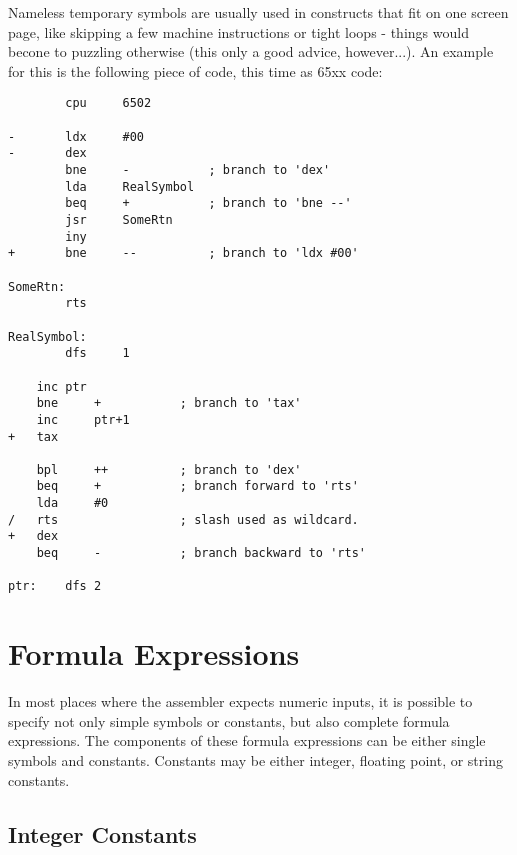 \documentclass[12pt,twoside]{report}
\begin{document}
Nameless temporary symbols are usually used in constructs that fit on one
screen page, like skipping a few machine instructions or tight loops -
things would becone to puzzling otherwise (this only a good advice,
however...).  An example for this is the following piece of code, this
time as 65xx code:
\begin{verbatim}
        cpu     6502

-       ldx     #00
-       dex
        bne     -           ; branch to 'dex'
        lda     RealSymbol
        beq     +           ; branch to 'bne --'
        jsr     SomeRtn
        iny
+       bne     --          ; branch to 'ldx #00'

SomeRtn:
        rts

RealSymbol:
        dfs     1

  	inc	ptr
   	bne 	+      	    ; branch to 'tax'
   	inc 	ptr+1
+ 	tax

 	bpl 	++     	    ; branch to 'dex'
   	beq 	+      	    ; branch forward to 'rts'
   	lda 	#0
/  	rts            	    ; slash used as wildcard.
+ 	dex
   	beq 	-           ; branch backward to 'rts'

ptr:	dfs	2
\end{verbatim}



\section{Formula Expressions}

In most places where the assembler expects numeric inputs, it is
possible to specify not only simple symbols or constants, but also
complete formula expressions.  The components of these formula
expressions can be either single symbols and constants.  Constants may be
either integer, floating point, or string constants.

\subsection{Integer Constants}
\label{SectIntConsts}
\end{document}
